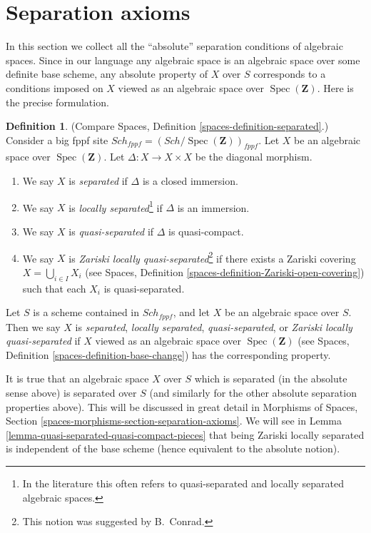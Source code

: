 \documentclass{stacks-project}
\theoremstyle{plain}
\theoremstyle{definition}
\newtheorem{definition}[subsection]{Definition}
\theoremstyle{remark}
\numberwithin{equation}{subsection}
\def\Spec{\mathop{\mathrm{Spec}}}
\def\Sch{\mathit{Sch}}
\begin{document}
\section{Separation axioms}
\label{section-separation}

\noindent
In this section we collect all the ``absolute'' separation conditions
of algebraic spaces. Since in our language any algebraic space is an
algebraic space over some definite base scheme, any absolute property
of $X$ over $S$ corresponds to a conditions imposed on $X$ viewed
as an algebraic space over $\Spec(\mathbf{Z})$. Here is the
precise formulation.

\begin{definition}
\label{definition-separated}
(Compare Spaces, Definition \ref{spaces-definition-separated}.)
Consider a big fppf site
$\Sch_{fppf} = (\Sch/\Spec(\mathbf{Z}))_{fppf}$.
Let $X$ be an algebraic space over
$\Spec(\mathbf{Z})$. Let $\Delta : X \to X \times X$
be the diagonal morphism.
\begin{enumerate}
\item We say $X$ is {\it separated} if $\Delta$ is a closed immersion.
\item We say $X$ is {\it locally separated}\footnote{In the
literature this often refers to quasi-separated and locally
separated algebraic spaces.} if $\Delta$ is an
immersion.
\item We say $X$ is {\it quasi-separated} if $\Delta$ is quasi-compact.
\item We say $X$ is {\it Zariski locally quasi-separated}\footnote{
This notion was suggested by B.\ Conrad.} if there
exists a Zariski covering $X = \bigcup_{i \in I} X_i$ (see Spaces,
Definition \ref{spaces-definition-Zariski-open-covering}) such that
each $X_i$ is quasi-separated.
\end{enumerate}
Let $S$ is a scheme contained in $\Sch_{fppf}$, and let
$X$ be an algebraic space over $S$. Then we say $X$ is {\it separated},
{\it locally separated}, {\it quasi-separated}, or
{\it Zariski locally quasi-separated}
if $X$ viewed as an algebraic space over $\Spec(\mathbf{Z})$ (see
Spaces, Definition \ref{spaces-definition-base-change})
has the corresponding property.
\end{definition}

\noindent
It is true that an algebraic space $X$ over $S$ which is separated
(in the absolute sense above) is separated over $S$ (and similarly
for the other absolute separation properties above). This will be discussed
in great detail in
Morphisms of Spaces, Section \ref{spaces-morphisms-section-separation-axioms}.
We will see in
Lemma \ref{lemma-quasi-separated-quasi-compact-pieces}
that being Zariski locally separated is independent of the base scheme
(hence equivalent to the absolute notion).
\end{document}
